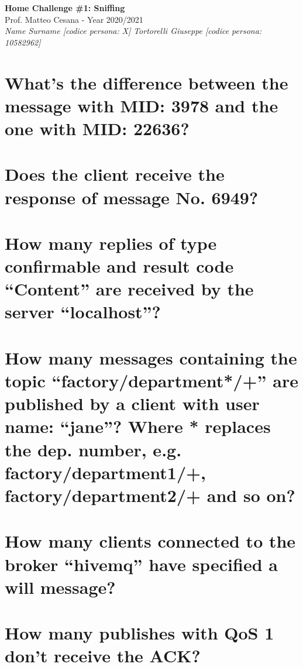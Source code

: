 \documentclass{article}
\begin{document}
\begin{titlepage}
   \begin{center}
      \Huge\textbf{Home Challenge \#1: Sniffing}\\
      \vspace{5mm} %
      \Large Prof. Matteo Cesana - Year 2020/2021\\
      \vspace{5mm} %
      \large\textit{Name Surname [codice persona: X]}
      \linebreak
      \large\textit{Tortorelli Giuseppe [codice persona: 10582962]}
   \end{center}
\end{titlepage}
\printindex

\tableofcontents
\pagebreak


\section{What’s the difference between the message with MID:
3978 and the one with MID: 22636?}
\section{Does the client receive the response of message No.
6949?}
\section{How many replies of type confirmable and result code
“Content” are received by the server “localhost”?}
\section{How many messages containing the topic
“factory/department*/+” are published by a client with
user name: “jane”? Where * replaces the dep. number,
e.g. factory/department1/+, factory/department2/+
and so on?}
\section{How many clients connected to the broker “hivemq”
have specified a will message?}
\section{How many publishes with QoS 1 don’t receive the ACK?}
\end{document}
